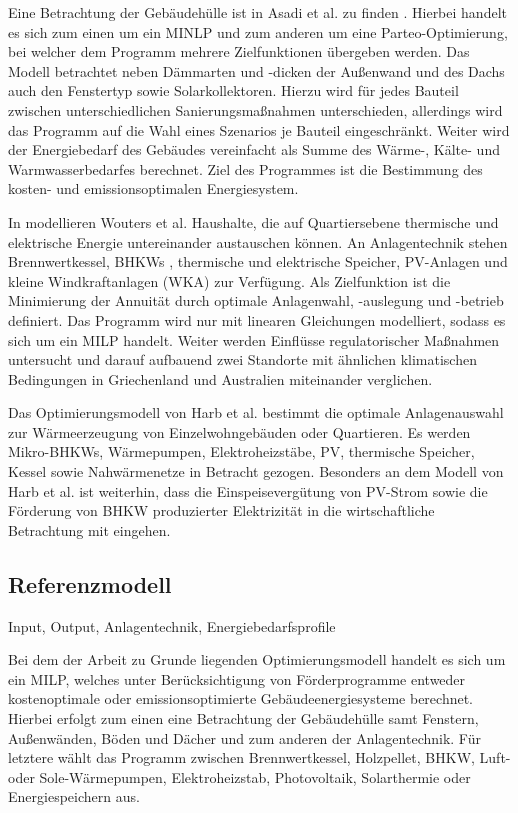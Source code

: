 Eine Betrachtung der Gebäudehülle ist in Asadi et al. zu finden \cite{Asadi.2012}.
Hierbei handelt es sich zum einen um ein MINLP und zum anderen um eine Parteo-Optimierung, bei welcher dem Programm mehrere Zielfunktionen übergeben werden.
Das Modell betrachtet neben Dämmarten und -dicken der Außenwand und des Dachs auch den Fenstertyp sowie Solarkollektoren. 
Hierzu wird für jedes Bauteil zwischen unterschiedlichen Sanierungsmaßnahmen unterschieden, allerdings wird das Programm auf die Wahl eines Szenarios je Bauteil eingeschränkt.
Weiter wird der Energiebedarf des Gebäudes vereinfacht als Summe des Wärme-, Kälte- und Warmwasserbedarfes berechnet.
Ziel des Programmes ist die Bestimmung des kosten- und emissionsoptimalen Energiesystem.

In \cite{Wouters.2014} modellieren Wouters et al. Haushalte, die auf Quartiersebene thermische und elektrische Energie untereinander austauschen können.
An Anlagentechnik stehen Brennwertkessel, BHKWs , thermische und elektrische Speicher, PV-Anlagen und kleine Windkraftanlagen (WKA) zur Verfügung.
Als Zielfunktion ist die Minimierung der Annuität durch optimale Anlagenwahl, -auslegung und -betrieb definiert.
Das Programm wird nur mit linearen Gleichungen modelliert, sodass es sich um ein MILP handelt.
Weiter werden Einflüsse regulatorischer Maßnahmen untersucht und darauf aufbauend zwei Standorte mit ähnlichen klimatischen Bedingungen in Griechenland und Australien miteinander verglichen.

Das Optimierungsmodell von Harb et al. \cite{Harb.2016} bestimmt die optimale Anlagenauswahl zur Wärmeerzeugung von Einzelwohngebäuden oder Quartieren.
Es werden Mikro-BHKWs, Wärmepumpen, Elektroheizstäbe, PV, thermische Speicher, Kessel sowie Nahwärmenetze in Betracht gezogen.
Besonders an dem Modell von Harb et al. ist weiterhin, dass die Einspeisevergütung von PV-Strom sowie die Förderung von BHKW produzierter Elektrizität in die wirtschaftliche Betrachtung mit eingehen.




\subsection{Referenzmodell}
\label{subsec:Sektion 252}
Input, Output, Anlagentechnik, Energiebedarfsprofile

Bei dem der Arbeit zu Grunde liegenden Optimierungsmodell handelt es sich um ein MILP, welches unter Berücksichtigung von Förderprogramme entweder kostenoptimale oder emissionsoptimierte Gebäudeenergiesysteme berechnet.
Hierbei erfolgt zum einen eine Betrachtung der Gebäudehülle samt Fenstern, Außenwänden, Böden und Dächer und zum anderen der Anlagentechnik.
Für letztere wählt das Programm zwischen Brennwertkessel, Holzpellet, BHKW, Luft- oder Sole-Wärmepumpen, Elektroheizstab, Photovoltaik, Solarthermie oder Energiespeichern aus.


